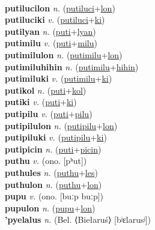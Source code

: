  \label{putiluci} \\
\textbf{putilucilon} \textit{n.} (\hyperref[putiluci]{putiluci}+\hyperref[lon]{lon})
 \label{putilucilon} \\
\textbf{putiluciki} \textit{v.} (\hyperref[putiluci]{putiluci}+\hyperref[ki]{ki})
 \label{putiluciki} \\
\textbf{putilyan} \textit{n.} (\hyperref[puti]{puti}+\hyperref[lyan]{lyan})
 \label{putilyan} \\
\textbf{putimilu} \textit{v.} (\hyperref[puti]{puti}+\hyperref[milu]{milu})
 \label{putimilu} \\
\textbf{putimilulon} \textit{n.} (\hyperref[putimilu]{putimilu}+\hyperref[lon]{lon})
 \label{putimilulon} \\
\textbf{putimiluhihin} \textit{n.} (\hyperref[putimilu]{putimilu}+\hyperref[hihin]{hihin})
 \label{putimiluhihin} \\
\textbf{putimiluki} \textit{v.} (\hyperref[putimilu]{putimilu}+\hyperref[ki]{ki})
 \label{putimiluki} \\
\textbf{putikol} \textit{n.} (\hyperref[puti]{puti}+\hyperref[kol]{kol})
 \label{putikol} \\
\textbf{putiki} \textit{v.} (\hyperref[puti]{puti}+\hyperref[ki]{ki})
 \label{putiki} \\
\textbf{putipilu} \textit{v.} (\hyperref[puti]{puti}+\hyperref[pilu]{pilu})
 \label{putipilu} \\
\textbf{putipilulon} \textit{n.} (\hyperref[putipilu]{putipilu}+\hyperref[lon]{lon})
 \label{putipilulon} \\
\textbf{putipiluki} \textit{v.} (\hyperref[putipilu]{putipilu}+\hyperref[ki]{ki})
 \label{putipiluki} \\
\textbf{putipicin} \textit{n.} (\hyperref[puti]{puti}+\hyperref[picin]{picin})
 \label{putipicin} \\
\textbf{puthu} \textit{v.} (ono. [pʰut])
 \label{puthu} \\
\textbf{puthules} \textit{n.} (\hyperref[puthu]{puthu}+\hyperref[les]{les})
 \label{puthules} \\
\textbf{puthulon} \textit{n.} (\hyperref[puthu]{puthu}+\hyperref[lon]{lon})
 \label{puthulon} \\
\textbf{pupu} \textit{v.} (ono. [buːp buːp])
 \label{pupu} \\
\textbf{pupulon} \textit{n.} (\hyperref[pupu]{pupu}+\hyperref[lon]{lon})
 \label{pupulon} \\
\textbf{'pyelalus} \textit{n.} (Bel. ⟨Biełaruś⟩ [bʲɛlarusʲ])
 \label{'pyelalus} \\
